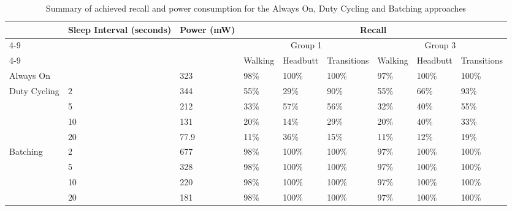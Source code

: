 \begin{table*}[t]
    \begin{tabular}{|l|l|l|l|l|l|l|l|l|}
    \hline
    \multirow{4}{*}{~} & \multirow{4}{*}{\parbox{2.2cm}{Sleep Interval (seconds)}} & \multirow{4}{*}{\parbox{1.2cm}{Power (mW)}} &\multicolumn{6}{c|}{Recall} \\ \cline{4-9}
                &  &  & \multicolumn{3}{c|}{Group 1} & \multicolumn{3}{c|}{Group 3}  \\ \cline{4-9}
                &  &  & Walking & Headbutt & Transitions & Walking & Headbutt & Transitions \\ \hline
    Always On    & ~              & 323        & 98\%    & 100\%    & 100\%       & 97\%    & 100\%    & 100\%       \\ \hline
    \multirow{4}{*}{Duty Cycling}
		& 2              & 344        & 55\%    & 29\%     & 90\%        & 55\%    & 66\%     & 93\%        \\ \cline{2-9}
		& 5              & 212        & 33\%    & 57\%     & 56\%        & 32\%    & 40\%     & 55\%        \\ \cline{2-9}
		& 10             & 131        & 20\%    & 14\%     & 29\%        & 20\%    & 40\%     & 33\%        \\ \cline{2-9}
		& 20             & 77.9       & 11\%    & 36\%     & 15\%        & 11\%    & 12\%     & 19\%        \\ \hline
    \multirow{4}{*}{Batching}
		& 2              & 677        & 98\%    & 100\%    & 100\%       & 97\%    & 100\%    & 100\%       \\ \cline{2-9}
		& 5              & 328        & 98\%    & 100\%    & 100\%       & 97\%    & 100\%    & 100\%       \\ \cline{2-9}
		& 10             & 220        & 98\%    & 100\%    & 100\%       & 97\%    & 100\%    & 100\%       \\ \cline{2-9}
		& 20             & 181        & 98\%    & 100\%    & 100\%       & 97\%    & 100\%    & 100\%       \\ \hline
    \end{tabular}
	\caption{Summary of achieved recall and power consumption for the Always On, Duty Cycling and Batching approaches}
	\label{table:summaryAA-DC-BATCHING}
\end{table*}

